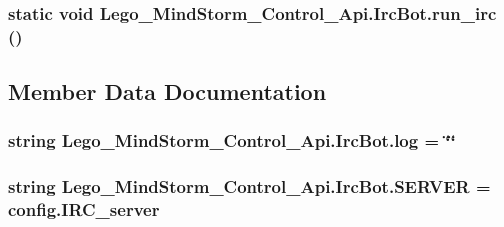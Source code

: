 \hypertarget{class_lego___mind_storm___control___api_1_1_irc_bot_f2b468ac038355a98db5bbdca4f9e21f}{
\subsubsection[{run\_\-irc}]{\setlength{\rightskip}{0pt plus 5cm}static void Lego\_\-MindStorm\_\-Control\_\-Api.IrcBot.run\_\-irc ()}}
\label{class_lego___mind_storm___control___api_1_1_irc_bot_f2b468ac038355a98db5bbdca4f9e21f}




\subsection{Member Data Documentation}
\hypertarget{class_lego___mind_storm___control___api_1_1_irc_bot_1ec85d48edfe39946b4231de41d8a532}{
\subsubsection[{log}]{\setlength{\rightskip}{0pt plus 5cm}string {\bf Lego\_\-MindStorm\_\-Control\_\-Api.IrcBot.log} = \char`\"{}\char`\"{}}}
\label{class_lego___mind_storm___control___api_1_1_irc_bot_1ec85d48edfe39946b4231de41d8a532}


\hypertarget{class_lego___mind_storm___control___api_1_1_irc_bot_5f338616b695cf4623dfacfab911fb47}{
\subsubsection[{SERVER}]{\setlength{\rightskip}{0pt plus 5cm}string {\bf Lego\_\-MindStorm\_\-Control\_\-Api.IrcBot.SERVER} = {\bf config.IRC\_\-server}}}
\label{class_lego___mind_storm___control___api_1_1_irc_bot_5f338616b695cf4623dfacfab911fb47}


